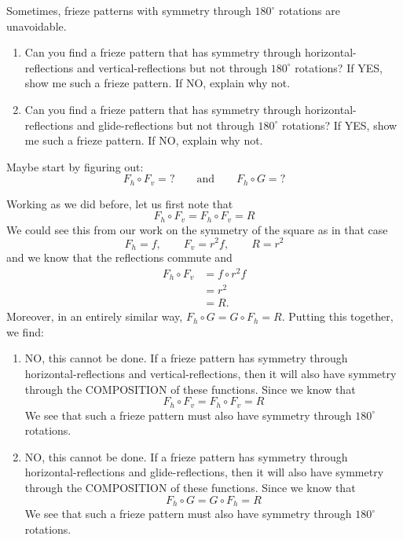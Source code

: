 \documentclass[noauthor,nooutcomes,hints,handout]{../ximera}
\begin{document}
\mynewpage

\begin{question}
  Sometimes, frieze patterns with symmetry through $180^\circ$
  rotations are unavoidable.
  \begin{enumerate}
  \item Can you find a frieze pattern that has symmetry through
    horizontal-reflections and vertical-reflections but not through
    $180^\circ$ rotations? If YES, show me such a frieze pattern. If
    NO, explain why not.
  \item Can you find a frieze pattern that has symmetry through
    horizontal-reflections and glide-reflections but not through
    $180^\circ$ rotations? If YES, show me such a frieze pattern. If
    NO, explain why not.
  \end{enumerate}
  \begin{hint}
    Maybe start by figuring out:
    \[
    F_h \circ F_v = ? \qquad\text{and}\qquad F_h \circ G = ?
    \]
  \end{hint}
  \begin{freeResponse}
    Working as we did before, let us first note that
    \[
    F_h \circ F_v = F_h \circ F_v= R
    \]
    We could see this from our work on the symmetry of the square as in that case
    \[
    F_h = f, \qquad F_v = r^2 f, \qquad R = r^2
    \]
    and we know that the reflections commute and 
    \begin{align*}
      F_h \circ F_v &= f \circ r^2 f \\
      &= r^2\\
      &= R.
    \end{align*}
    Moreover, in an entirely similar way, $F_h \circ G = G\circ F_h =
    R$. Putting this together, we find:
    \begin{enumerate}
    \item NO, this cannot be done. If a frieze pattern has symmetry
      through horizontal-reflections and vertical-reflections, then it
      will also have symmetry through the COMPOSITION of these
      functions. Since we know that
      \[
      F_h \circ F_v = F_h \circ F_v= R
      \]
      We see that such a frieze pattern must also have symmetry
      through $180^\circ$ rotations.
    \item NO, this cannot be done.  If a frieze pattern has symmetry
      through horizontal-reflections and glide-reflections, then it
      will also have symmetry through the COMPOSITION of these
      functions. Since we know that
      \[
      F_h \circ G = G\circ F_h =
      R
      \]
      We see that such a frieze pattern must also have symmetry
      through $180^\circ$ rotations.
    \end{enumerate}
  \end{freeResponse}
\end{question}
\end{document}
